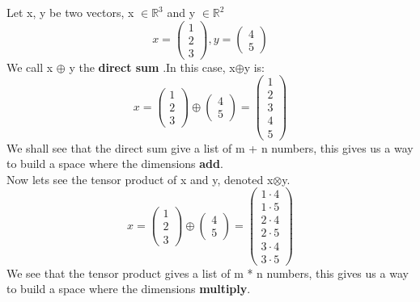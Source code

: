 \documentclass[12pt,a4paper]{article}
\begin{document}
Let x, y be two vectors, x $\in\mathbb{R}^3$ and y $\in\mathbb{R}^2$
\[x = 
\begin{pmatrix}
1\\2\\3
\end{pmatrix}
,y = 
\begin{pmatrix}
4\\5
\end{pmatrix}
\]
We call x $\oplus$ y the \textbf{direct sum} .In this case, x$\oplus$y is:
\[x = 
\begin{pmatrix}
1\\2\\3
\end{pmatrix}
\oplus
\begin{pmatrix}
4\\5
\end{pmatrix}
=\begin{pmatrix}
1\\2\\3\\4\\5
\end{pmatrix}
\]
We shall see that the direct sum give a list of m + n numbers, this gives us a way to build a space where the dimensions \textbf{add}.\\
Now lets see the tensor product of x and y, denoted x$\otimes$y.
\[x = 
\begin{pmatrix}
1\\2\\3
\end{pmatrix}
\oplus
\begin{pmatrix}
4\\5
\end{pmatrix}
=\begin{pmatrix}
1 \cdot 4 \\ 1 \cdot 5\\2 \cdot 4\\2 \cdot 5\\3 \cdot 4\\3 \cdot 5
\end{pmatrix}
\]
We see that the tensor product gives a list of m * n numbers, this gives us a way to build a space where the dimensions \textbf{multiply}.
\end{document}
